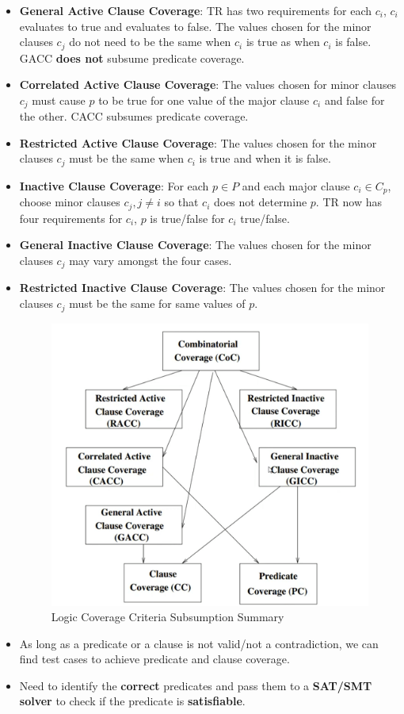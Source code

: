 \documentclass[a4paper]{article}
\begin{document}
\begin{itemize}
    \item \textbf{General Active Clause Coverage}: TR has two requirements for each $c_i$, $c_i$ evaluates to true and evaluates to false. The values chosen for the minor clauses $c_j$ do not need to be the same when $c_i$ is true as when $c_i$ is false. GACC \textbf{does not} subsume predicate coverage.
    \item \textbf{Correlated Active Clause Coverage}: The values chosen for minor clauses $c_j$ must cause $p$ to be true for one value of the major clause $c_i$ and false for the other. CACC subsumes predicate coverage.
    \item \textbf{Restricted Active Clause Coverage}: The values chosen for the minor clauses $c_j$ must be the same when $c_i$ is true and when it is false.
    \item \textbf{Inactive Clause Coverage}: For each $p\in P$ and each major clause $c_i\in C_p$, choose minor clauses $c_j, j\neq i$ so that $c_i$ does not determine $p$. TR now has four requirements for $c_i$, $p$ is true/false for $c_i$ true/false.
    \item \textbf{General Inactive Clause Coverage}: The values chosen for the minor clauses $c_j$ may vary amongst the four cases.
    \item \textbf{Restricted Inactive Clause Coverage}: The values chosen for the minor clauses $c_j$ must be the same for same values of $p$.
    \begin{figure}[H]
        \centering
        \includegraphics[width=0.5\linewidth]{Degree//static/ST_logic_subsume_summary.png}
        \caption{Logic Coverage Criteria Subsumption Summary}
    \end{figure}
    \item As long as a predicate or a clause is not valid/not a contradiction, we can find test cases to achieve predicate and clause coverage.
    \item Need to identify the \textbf{correct} predicates and pass them to a \textbf{SAT/SMT solver} to check if the predicate is \textbf{satisfiable}.

\end{itemize}
\end{document}

